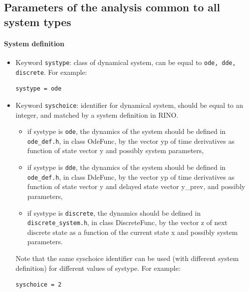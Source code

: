 \documentclass{article}
\begin{document}
\subsection{Parameters of the analysis common to all system types \label{common}}

\paragraph{System definition}
\begin{itemize}
\item Keyword \texttt{systype}: class of dynamical system, can be equal to \texttt{ode, dde, discrete}.  For example:
\begin{verbatim}
systype = ode
\end{verbatim}

\item Keyword \texttt{syschoice}: identifier for dynamical system,  should be equal to an integer, and matched by a system definition in RINO.
\begin{itemize}
\item if systype is \texttt{ode}, the dynamics of the system should be defined in   \texttt{ode\_def.h}, in class OdeFunc,  by the vector yp  of time derivatives as function of state vector y and possibly system parameters, 
\item if systype is \texttt{dde}, the dynamics of the system should be defined in   \texttt{ode\_def.h}, in class DdeFunc,  by the vector yp  of time derivatives as function of state vector y and delayed state vector y\_prev,  and possibly parameters,
\item if systype is \texttt{discrete},  the dynamics should be defined in \texttt{discrete\_system.h}, in class DiscreteFunc, by the vector z of next discrete state as a function of the current state x and possibly system parameters. 
\end{itemize}
Note that the same syschoice identifier can be used (with different system definition) for different values of systype.  
For example:
\begin{verbatim}
syschoice = 2
\end{verbatim}
\end{itemize}
\end{document}
